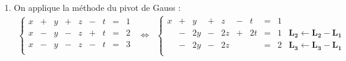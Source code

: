 \documentclass[a4paper, 11pt,reqno]{article}
\begin{document}
\begin{correction}
\begin{enumerate}
$$\begin{array}{rcl}
\left\lbrace\begin{array}{rcrcrcr}
2x &+ &y &+ & z & = &1\\
x &- &y &- & z & = &2\\
4x &- &y &- & z & = &3\\
\end{array}\right.
& \Leftrightarrow &
\left\lbrace\begin{array}{rcrcrcrl}
y &+ &z &+ & 2x & = &1\\
-y &- &z &+& x & = &2\\
-y &- &z &+ & 4x & = &3\\
\end{array}\right.\vsec\\
& \Leftrightarrow &
\left\lbrace\begin{array}{rcrcrcrl}
y &+ &z &+ & 2x & = &1\\
 && && 3x & = &3 & \mathbf{L_2 \leftarrow L_2+L_1}\\
 & & & & 6x & = &4 & \mathbf{L_3 \leftarrow L_3+L_1}\\
\end{array}\right.\vsec\\
& \Leftrightarrow &
\left\lbrace\begin{array}{rcrcrcrl}
y &+ &z &+ & 2x & = &1\\
 && && 3x & = &3 \\
 & & & & 0 & = &-2 & \mathbf{L_3 \leftarrow L_3-2L_2}\\
\end{array}\right.
\end{array}$$
Le syst\`eme est \'echelonn\'e de rang 2 et $\fbox{$ \mathcal{S}=\emptyset $}$.
\item On applique la m\'ethode du pivot de Gauss :
$$\begin{array}{rcl}
\left\lbrace\begin{array}{rcrcrcrcr}
x &+ &y &+ & z &-& t& = &1\\
x &- &y &- & z &+& t& = &2\\
x &- &y &- & z &-& t& = &3\\
\end{array}\right.
& \Leftrightarrow &
\left\lbrace\begin{array}{rcrcrcrcrl}
x &+ &y &+ & z &-& t& = &1\\
 &- &2y &- &2 z &+& 2t& = &1 & \mathbf{L_2 \leftarrow L_2-L_1}\\
 & -&2y &- &2 z && & = &2 & \mathbf{L_3 \leftarrow L_3-L_1}\\

\end{array}
\end{array}$$
\end{enumerate}
\end{correction}
\end{document}
